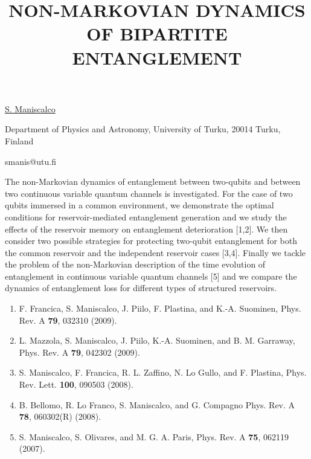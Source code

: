 \title{NON-MARKOVIAN DYNAMICS OF BIPARTITE ENTANGLEMENT}

\underline{S. Maniscalco} 

{\normalsize{\vspace{-4mm}
Department of Physics and Astronomy, University of Turku, 20014
Turku, Finland

\email smanis@utu.fi}}

The non-Markovian dynamics of entanglement between two-qubits and between two continuous variable quantum channels is
investigated.
For the case of two qubits immersed in a common environment, we demonstrate the optimal conditions for reservoir-mediated
entanglement generation and we study the effects of the reservoir memory on entanglement deterioration [1,2].
We then consider two possible strategies for protecting two-qubit entanglement for both the common reservoir and the
independent reservoir cases [3,4].
Finally we tackle the problem of the non-Markovian description of the time evolution of entanglement in continuous variable
quantum channels [5] and we compare the dynamics of entanglement loss for different types of structured reservoirs.

\vspace{-4mm} {\normalsize
\begin{enumerate}
\item F. Francica, S. Maniscalco, J. Piilo, F. Plastina, and
K.-A. Suominen, Phys. Rev. A \textbf{79}, 032310 (2009).
\item L. Mazzola, S. Maniscalco, J. Piilo, K.-A.
Suominen, and B. M. Garraway, Phys. Rev. A \textbf{79}, 042302
(2009). \item S. Maniscalco, F. Francica, R. L. Zaffino, N. Lo
Gullo, and F. Plastina, Phys. Rev. Lett. \textbf{100}, 090503
(2008). \item B. Bellomo, R. Lo Franco, S. Maniscalco, and G.
Compagno Phys. Rev. A \textbf{78}, 060302(R) (2008).
\item S. Maniscalco, S. Olivares, and M. G. A. Paris, Phys. Rev. A
\textbf{75}, 062119 (2007).
\end{enumerate}
}

\vspace{\baselineskip}